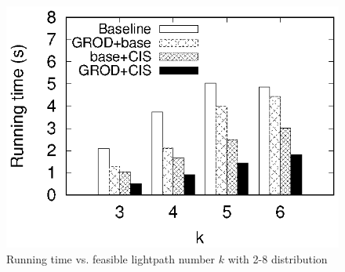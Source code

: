 \begin{figure}
\begin{minipage}[c]{0.23\textwidth}
\includegraphics[width=1\textwidth]{28_k_time_histogram.eps}
\caption{Running time vs. feasible lightpath number $k$ with 2-8 distribution}\label{fig:28_k_time_histogram}
\end{minipage}
\vspace{-0.3cm}

\hspace{1mm}
\begin{minipage}[c]{0.23\textwidth}
\centering


\end{minipage}
\end{figure}
